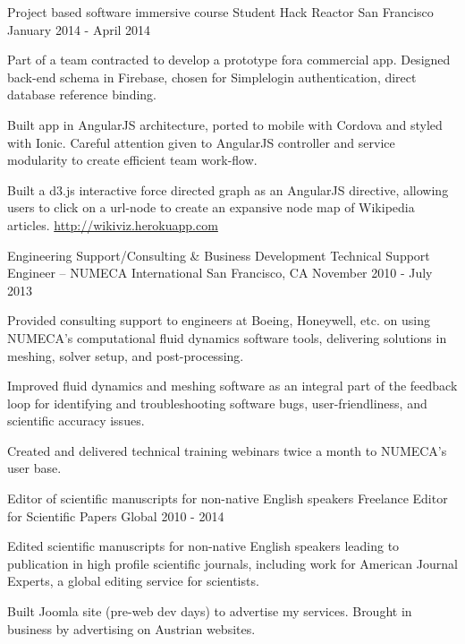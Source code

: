 \begin{cventries}
  \cventry
    {Project based software immersive course}
    {Student{\enskip\cdotp\enskip} Hack Reactor}
    {San Francisco}
    {January 2014 - April 2014}
    {
      \begin{cvitems}
        \item {Part of a team contracted to develop a prototype fora  commercial app. Designed back-end schema in Firebase, chosen for Simplelogin authentication, direct database reference binding.}
        \item {Built app in AngularJS architecture, ported to mobile with Cordova and styled with Ionic. Careful attention given to AngularJS controller and service modularity to create efficient team work-flow.}
        \item {Built a d3.js interactive force directed graph as an AngularJS directive, allowing users to click on a url-node to create an expansive node map of Wikipedia articles. {\tiny \url{http://wikiviz.herokuapp.com}}}
      \end{cvitems} 
    }
    
  \cventry
    {Engineering Support/Consulting \& Business Development}
    {Technical Support Engineer – NUMECA International}
    {San Francisco, CA}
    {November 2010 - July 2013}
    {
      \begin{cvitems}
        \item {Provided consulting support to engineers at Boeing, Honeywell, etc. on using NUMECA’s computational fluid dynamics software tools, delivering solutions in meshing, solver setup, and post-processing.}
        \item {Improved fluid dynamics and meshing software as an integral part of the feedback loop for identifying and troubleshooting software bugs, user-friendliness, and scientific accuracy issues.}
        \item Created and delivered technical training webinars twice a month to NUMECA’s user base.
      \end{cvitems}
    }
    
  \cventry
    {Editor of scientific manuscripts for non-native English speakers}
    {Freelance Editor for Scientific Papers}
    {Global}
    {2010 - 2014}
    {
      \begin{cvitems}
        \item {Edited scientific manuscripts for non-native English speakers leading to publication in high profile scientific journals, including work for American Journal Experts, a global editing service for scientists.}
        \item {Built Joomla site (pre-web dev days) to advertise my services. Brought in business by advertising on Austrian websites.}
      \end{cvitems}
    }
    

\end{cventries}
